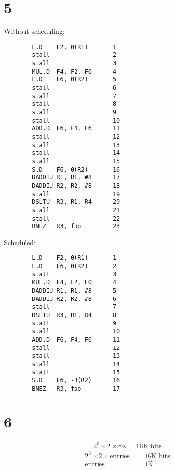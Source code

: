 \documentclass{article}
\begin{document}
\begin{multicols*}{2}
    \section*{5}
    Without scheduling:
    \begin{verbatim}
        L.D    F2, 0(R1)       1
        stall                  2
        stall                  3
        MUL.D  F4, F2, F0      4
        L.D    F6, 0(R2)       5
        stall                  6
        stall                  7
        stall                  8
        stall                  9
        stall                  10
        ADD.D  F6, F4, F6      11
        stall                  12
        stall                  13
        stall                  14
        stall                  15
        S.D    F6, 0(R2)       16
        DADDIU R1, R1, #8      17
        DADDIU R2, R2, #8      18
        stall                  19
        DSLTU  R3, R1, R4      20
        stall                  21
        stall                  22
        BNEZ   R3, foo         23
    \end{verbatim}
    Scheduled:
    \begin{verbatim}
        L.D    F2, 0(R1)       1
        L.D    F6, 0(R2)       2
        stall                  3
        MUL.D  F4, F2, F0      4
        DADDIU R1, R1, #8      5
        DADDIU R2, R2, #8      6
        stall                  7
        DSLTU  R3, R1, R4      8
        stall                  9
        stall                  10
        ADD.D  F6, F4, F6      11
        stall                  12
        stall                  13
        stall                  14
        stall                  15
        S.D    F6, -8(R2)      16
        BNEZ   R3, foo         17
    \end{verbatim}
    \section*{6}
    \begin{align*}
        2^0 \times 2 \times 8\text{K} = 16 \text{K bits}
    \end{align*}
    \begin{align*}
        2^3 \times 2 \times \text{entries} & = 16 \text{K bits} \\
        \text{entries}                     & = 1\text{K}
    \end{align*}
\end{multicols*}
\end{document}
